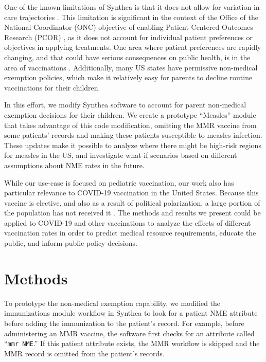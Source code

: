 \documentclass[12pt]{article}
\begin{document}
One of the known limitations of Synthea is that it does not allow for variation in care trajectories \cite[p. 15]{challenge-webinar-slides}.  This limitation is significant in the context of the Office of the National Coordinator (ONC) objective of enabling Patient-Centered Outcomes Research (PCOR) \cite[pp. 3,9]{challenge-webinar-slides}, as it does not account for individual patient preferences or objectives in applying treatments.  One area where patient preferences are rapidly changing, and that could have serious consequences on public health, is in the area of vaccinations \cite{antivax,vaccine-rates-cdc}.  Additionally, many US states have permissive non-medical exemption policies, which make it relatively easy for parents to decline routine vaccinations for their children.

In this effort, we modify Synthea software to account for parent non-medical exemption decisions for their children.  We create a prototype ``Measles'' module that takes advantage of this code modification, omitting the MMR vaccine from some patients' records and making these patients susceptible to measles infection.  These updates make it possible to analyze where there might be high-risk regions for measles in the US, and investigate what-if scenarios based on different assumptions about NME rates in the future.

While our use-case is focused on pediatric vaccination, our work also has particular relevance to COVID-19 vaccination in the United States.  Because this vaccine is elective, and also as a result of political polarization, a large portion of the population has not received it \cite{latimes-antivax}.  The methods and results we present could be applied to COVID-19 and other vaccinations to analyze the effects of different vaccination rates in order to predict medical resource requirements, educate the public, and inform public policy decisions.

\section{Methods}

To prototype the non-medical exemption capability, we modified the immunizations module \cite{synthea-immunizations} workflow in Synthea to look for a patient NME attribute before adding the immunization to the patient's record.  For example, before administering an MMR vaccine, the software first checks for an attribute called ``\texttt{mmr NME}.''  If this patient attribute exists, the MMR workflow is skipped and the MMR record is omitted from the patient's records.
\end{document}
